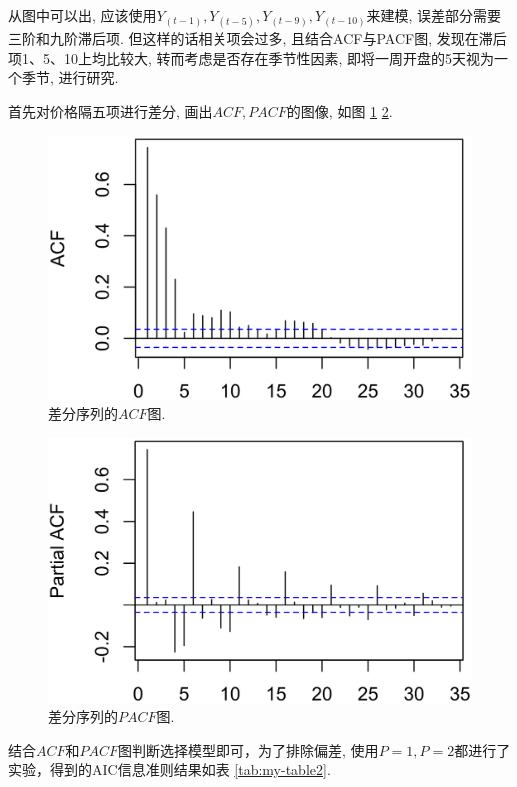\documentclass[11pt]{article}
\begin{document}
\qquad 从图中可以出, 应该使用$Y_{(t-1)},Y_{(t-5)},Y_{(t-9)},Y_{(t-10)}$来建模, 误差部分需要三阶和九阶滞后项. 但这样的话相关项会过多, 且结合ACF与PACF图, 发现在滞后项1、5、10上均比较大, 转而考虑是否存在季节性因素, 即将一周开盘的5天视为一个季节, 进行研究. 

\qquad 首先对价格隔五项进行差分, 画出$ACF, PACF$的图像, 如图 \ref{fig:acf1} \ref{fig:pacf1}.
\begin{center}
    \hspace{30pt}\begin{minipage}{0.45\textwidth}
        \begin{figure}
            \centering
            \hspace{-30pt}\includegraphics[width=.9\textwidth]{acf1}
            \caption{差分序列的$ACF$图.\label{fig:acf1}}
        \end{figure}
    \end{minipage}
    \begin{minipage}{0.45\textwidth}
        \begin{figure}
            \centering
            \hspace{-25pt}\includegraphics[width=.9\textwidth]{pacf1}
            \caption{差分序列的$PACF$图.\label{fig:pacf1}}
        \end{figure}
    \end{minipage}
\end{center}
\qquad 结合$ACF$和$PACF$图判断选择模型即可，为了排除偏差, 使用$P=1,P=2$都进行了实验，得到的AIC信息准则结果如表 \ref{tab:my-table2}. 
\end{document}
